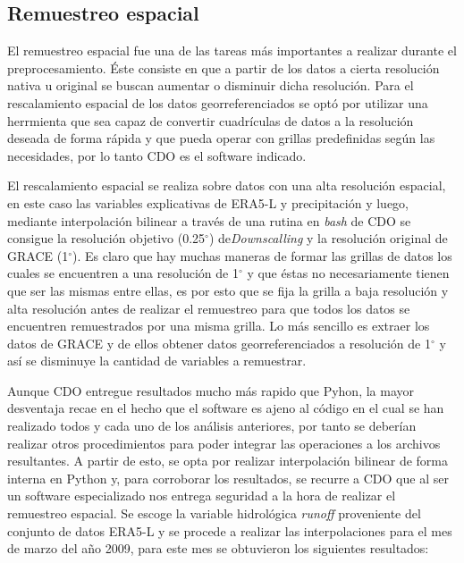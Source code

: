     \subsection{Remuestreo espacial}
    
    El remuestreo espacial fue una de las tareas más importantes a realizar durante el preprocesamiento. Éste consiste en que a partir de los datos a cierta
    resolución nativa u original se buscan aumentar o disminuir dicha resolución. Para el rescalamiento espacial de los datos georreferenciados se optó por utilizar una herrmienta que sea capaz de convertir 
    cuadrículas de datos a la resolución deseada de forma rápida y que pueda operar con grillas predefinidas según las necesidades, por lo tanto CDO es el software indicado. 

    
    El rescalamiento espacial se realiza sobre datos con una alta resolución espacial, en este caso las variables explicativas de ERA5-L y precipitación y luego, mediante interpolación bilinear a través de una rutina en \textit{bash} de CDO se consigue
    la resolución objetivo (0.25$^\circ$) de\textit{Downscalling} y la resolución original de GRACE (1$^\circ$). Es claro que hay muchas maneras de formar las grillas de datos los cuales se encuentren a una resolución de 
    1$^\circ$ y que éstas no necesariamente tienen que ser las mismas entre ellas, es por esto que se fija la grilla a baja resolución y alta resolución antes de realizar el remuestreo
    para que todos los datos se encuentren remuestrados por una misma grilla. Lo más sencillo es extraer los datos de GRACE y de ellos obtener datos georreferenciados a resolución de 1$^\circ$ y así se disminuye la cantidad de
    variables a remuestrar.

    Aunque CDO entregue resultados mucho más rapido que Pyhon, la mayor desventaja recae en el hecho que el software es ajeno al código en el cual se han realizado todos y cada uno de los análisis anteriores, por tanto se deberían realizar otros procedimientos para poder integrar las operaciones a los archivos resultantes.
    A partir de esto, se opta por realizar interpolación bilinear de forma interna en Python y, para corroborar los resultados, se recurre a CDO que al ser un software especializado nos entrega seguridad a la hora de realizar el remuestreo
    espacial. Se escoge la variable hidrológica \textit{runoff} proveniente del conjunto de datos ERA5-L y se procede a realizar las interpolaciones para el mes de marzo del año 2009, para este mes se obtuvieron los siguientes resultados:
    
